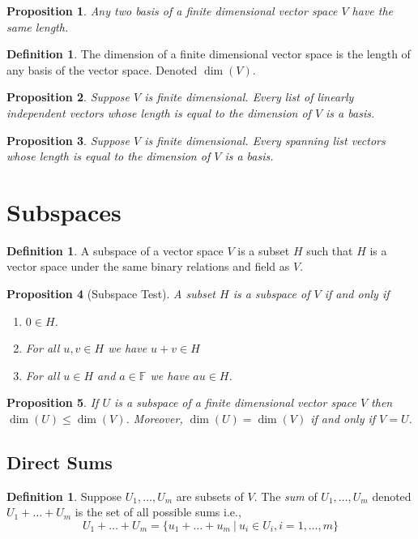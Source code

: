 \documentclass[12pt,letterpaper]{article}
\theoremstyle{plain}
\newtheorem{proposition}{Proposition}[section]
\theoremstyle{definition}
\newtheorem{definition}[theorem]{Definition}
\numberwithin{equation}{section}
\begin{document}
\begin{proposition} Any two basis of a finite dimensional vector space $V$ have the same length. 
\end{proposition}

\begin{definition} The dimension of a finite dimensional vector space is the length of any basis of the vector space. Denoted $\dim(V)$. 
\end{definition}

\begin{proposition} Suppose $V$ is finite dimensional. Every list of linearly independent vectors whose length is equal to the dimension of $V$ is a basis. 
\end{proposition}

\begin{proposition} Suppose $V$ is finite dimensional. Every spanning list vectors whose length is equal to the dimension of $V$ is a basis. 
\end{proposition}

\section{Subspaces}
\begin{definition} A subspace of a vector space $V$ is a subset $H$ such that $H$ is a vector space under the same binary relations and field as $V$. 
\end{definition}

\begin{proposition}[Subspace Test] A subset $H$ is a subspace of $V$ if and only if 
\begin{enumerate}[1.] 
\item $0\in H$. 
\item For all $u,v\in H$ we have $u+v\in H$
\item For all $u\in H$ and $a\in \mathbb{F}$ we have $au\in H$.
\end{enumerate}
\end{proposition}

\begin{proposition} If $U$ is a subspace of a finite dimensional vector space $V$ then $\dim(U)\leq\dim(V)$. Moreover, $\dim(U)=\dim(V)$ if and only if $V=U$. 
\end{proposition}

\subsection{Direct Sums}
\begin{definition} Suppose $U_1,\ldots, U_m$ are subsets of $V$. The \emph{sum} of $U_1, \ldots, U_m$ denoted $U_1+\ldots+U_m$ is the set of all possible sums i.e., 
\[U_1+\ldots+U_m=\{u_1+\ldots+u_m\ |\ u_i\in U_i, i=1,\ldots, m\}\]
\end{definition}
\end{document}
